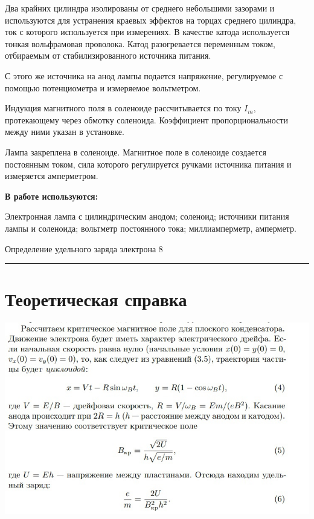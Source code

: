 \documentclass[12pt,a4paper]{scrartcl}
\begin{document}
		Два крайних цилиндра изолированы от среднего небольшими зазорами и используются для устранения краевых эффектов на торцах среднего цилиндра, ток с которого используется при измерениях. В качестве катода используется тонкая вольфрамовая проволока. Катод разогревается переменным током, отбираемым от стабилизированного источника питания. 

С этого же источника на анод лампы подается напряжение, регулируемое с помощью потенциометра и измеряемое вольтметром.

Индукция магнитного поля в соленоиде рассчитывается по току $I_m$, протекающему через обмотку соленоида. Коэффициент пропорциональности между ними указан в установке.

Лампа закреплена в соленоиде. Магнитное поле в соленоиде создается постоянным током, сила которого регулируется ручками источника питания и измеряется амперметром.

	\textbf{В работе используются:}
	
	Электронная лампа с цилиндрическим анодом; соленоид; источники питания лампы и соленоида; вольтметр постоянного тока; миллиамперметр, амперметр.
	
\newpage
	
	\begin{flushleft}
		\footnotesize{Определение удельного заряда электрона} \hspace{\fill} \footnotesize{8}
		\\[-0.3cm]\noindent\rule{\textwidth}{0.3pt}
	\end{flushleft}

\section{Теоретическая справка}	

\begin{center}
    \includegraphics[scale=0.7]{THEO_3.jpg}\\
  \end{center}
  
\end{document}
